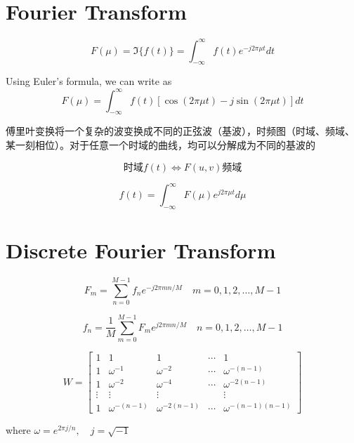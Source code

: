 \section{Fourier Transform}

\begin{definition}
    $$F(\mu) = \Im\{f(t)\}=\int_{-\infty}^{\infty} f(t) e^{-j 2 \pi \mu t} d t $$

    Using Euler's formula, we can write as
$$
F(\mu)=\int_{-\infty}^{\infty} f(t)[\cos (2 \pi \mu t)-j \sin (2 \pi \mu t)] d t
$$
\end{definition}

傅里叶变换将一个复杂的波变换成不同的正弦波（基波），时频图（时域、频域、某一刻相位）。对于任意一个时域的曲线，均可以分解成为不同的基波的

$$时域f(t) \Leftrightarrow F(u,v) 频域$$

\begin{definition}
    $$ f(t)=\int_{-\infty}^{\infty} F(\mu) e^{j 2 \pi \mu t} d \mu $$
\end{definition}


\section{Discrete Fourier Transform}

\begin{definition}
    $$ F_{m}=\sum_{n=0}^{M-1} f_{n} e^{-j 2 \pi m n / M} \quad m=0,1,2, \ldots, M-1 $$
\end{definition}

\begin{definition}
    $$ f_{n}=\frac{1}{M} \sum_{m=0}^{M-1} F_{m} e^{j 2 \pi m n / M} \quad n=0,1,2, \ldots, M-1 $$
\end{definition}

\begin{definition}[离散傅里叶变换矩阵$W$]
    $$ W=\left[\begin{array}{ccccc}1 & 1 & 1 & \cdots & 1 \\ 1 & \omega^{-1} & \omega^{-2} & \cdots & \omega^{-(n-1)} \\ 1 & \omega^{-2} & \omega^{-4} & \cdots & \omega^{-2(n-1)} \\ \vdots & \vdots & \vdots & & \vdots \\ 1 & \omega^{-(n-1)} & \omega^{-2(n-1)} & \cdots & \omega^{-(n-1)(n-1)}\end{array}\right] $$

    where $ \omega=e^{2 \pi j / n}, \quad j=\sqrt{-1} $
\end{definition}

